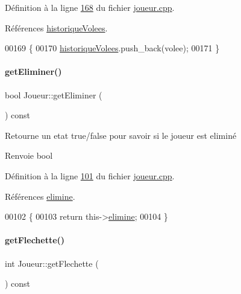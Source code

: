 Définition à la ligne \hyperlink{joueur_8cpp_source_l00168}{168} du fichier \hyperlink{joueur_8cpp_source}{joueur.\+cpp}.



Références \hyperlink{joueur_8h_source_l00042}{historique\+Volees}.


\begin{DoxyCode}
00169 \{
00170     \hyperlink{class_joueur_aeb24d1e8125a7bf302167b91a945687e}{historiqueVolees}.push\_back(volee);
00171 \}
\end{DoxyCode}
\mbox{\label{class_joueur_abb5b33a4782973be4f5b238385c94cac}} 
\paragraph{\texorpdfstring{get\+Eliminer()}{getEliminer()}}
{\footnotesize\ttfamily bool Joueur\+::get\+Eliminer (\begin{DoxyParamCaption}{ }\end{DoxyParamCaption}) const}



Retourne un etat true/false pour savoir si le joueur est eliminé 

\begin{DoxyReturn}{Renvoie}
bool 
\end{DoxyReturn}


Définition à la ligne \hyperlink{joueur_8cpp_source_l00101}{101} du fichier \hyperlink{joueur_8cpp_source}{joueur.\+cpp}.



Références \hyperlink{joueur_8h_source_l00047}{elimine}.


\begin{DoxyCode}
00102 \{
00103     \textcolor{keywordflow}{return} this->\hyperlink{class_joueur_acac733012102f81d05b0a4c0801fcf61}{elimine};
00104 \}
\end{DoxyCode}
\mbox{\label{class_joueur_a6a9730a4653b10e507c32715920bdea5}} 
\paragraph{\texorpdfstring{get\+Flechette()}{getFlechette()}}
{\footnotesize\ttfamily int Joueur\+::get\+Flechette (\begin{DoxyParamCaption}{ }\end{DoxyParamCaption}) const}



